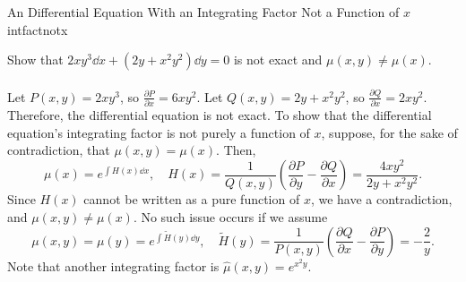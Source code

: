         \begin{example}{An Differential Equation With an Integrating Factor Not a Function of \(x\)}{intfactnotx}
            
            Show that \(2xy^3\dd x+(2y+x^2y^2)\dd y=0\) is not exact and \(\mu(x,y)\neq\mu(x)\).
            \\
            \\
            Let \(P(x,y)=2xy^3\), so \(\frac{\partial P}{\partial x}=6xy^2\). Let \(Q(x,y)=2y+x^2y^2\), so \(\frac{\partial Q}{\partial x}=2xy^2\). Therefore, the differential equation is not exact. To show that the differential equation's integrating factor is not purely a function of \(x\), suppose, for the sake of contradiction, that \(\mu(x,y)=\mu(x)\). Then,
            \begin{equation*}
                \mu(x)=e^{\int H(x)\dd x},\quad H(x)=\frac{1}{Q(x,y)}\left(\frac{\partial P}{\partial y}-\frac{\partial Q}{\partial x}\right)=\frac{4xy^2}{2y+x^2y^2}.
            \end{equation*}
            Since \(H(x)\) cannot be written as a pure function of \(x\), we have a contradiction, and \(\mu(x,y)\neq\mu(x)\). No such issue occurs if we assume 
            \begin{equation*}
                \mu(x,y)=\mu(y)=e^{\int \tilde{H}(y)\dd y}, \quad \tilde{H}(y)=\frac{1}{P(x,y)}\left(\frac{\partial Q}{\partial x}-\frac{\partial P}{\partial y}\right)=-\frac{2}{y}.
            \end{equation*}
            Note that another integrating factor is \(\hat{\mu}(x,y)=e^{x^2y}\).

        \end{example}